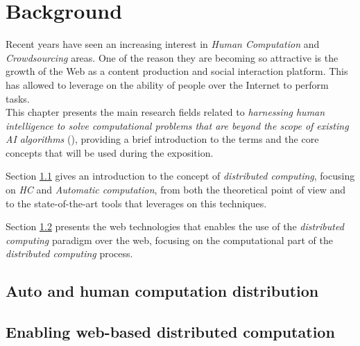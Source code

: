 \chapter{Background}
\label{cap:bg}


Recent years have seen an increasing interest in \emph{Human Computation}
and \emph{Crowdsourcing} areas. One of the reason they are becoming
so attractive is the growth of the Web as a content production and social
interaction platform. This has allowed to leverage on the ability of people over
the Internet to perform tasks.\\

This chapter presents the main research fields related to \emph{harnessing human
intelligence to solve computational problems that are beyond the scope of existing
\ac{AI} algorithms} (\cite{human:comp}), providing a brief introduction to the
terms and the core concepts that will be used during the exposition.

Section \ref{sec:bg:crowd} gives an introduction to the concept of \emph{distributed
computing}, focusing on \emph{\ac{HC}} and \emph{Automatic computation}, from
both the theoretical point of view and to the state-of-the-art tools that
leverages on this techniques.

Section \ref{sec:bg:web} presents the web technologies that enables the 
use of the \emph{distributed computing} paradigm over the web, focusing on the
computational part of the \emph{distributed computing} process.

\section{Auto and human computation distribution}
\label{sec:bg:crowd}




\section{Enabling web-based distributed computation}
\label{sec:bg:web}
